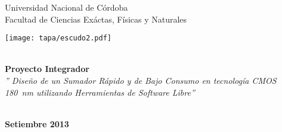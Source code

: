 \begin{titlepage}
\pagestyle{empty}       

\begin{center}
	\Huge{Universidad Nacional de Córdoba\\}
	\Large {Facultad de Ciencias Exáctas, Físicas y Naturales}\\

\vspace{1cm}

\texttt{[image: tapa/escudo2.pdf]}


\vspace{1cm}


	\Huge \textbf{\\[2ex]Proyecto Integrador}
	\Large \textsl{\\[2ex] '' Diseño de un Sumador Rápido y de Bajo Consumo en tecnología CMOS 180~nm utilizando Herramientas de Software Libre''}

	\begin{normalsize}
	\end{normalsize}
	\begin{large}	
		\\ \textbf{Setiembre 2013}
	\end{large}

\end{center}

\vspace{0.5cm}

\begin{center}



\end{center}

\hfuzz=50pt
\end{titlepage}

